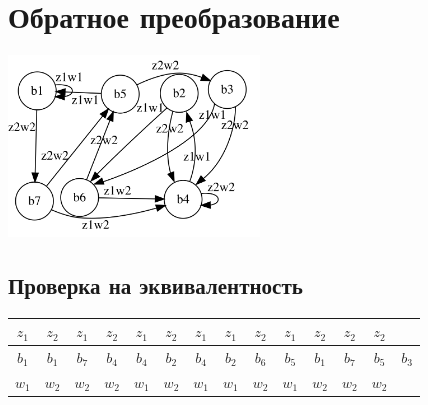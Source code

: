 \documentclass[listings]{labreport}
\begin{document}
\section*{Обратное преобразование}

\includegraphics[width=0.5\textwidth]{mealy.png}

\subsection*{Проверка на эквивалентность}

\begin{tabular}{|c|c|c|c|c|c|c|c|c|c|c|c|c|c|}
\hline
$z_1$ & $z_2$ & $z_1$ & $z_2$ & $z_1$ & $z_2$ & $z_1$ & $z_1$ & $z_2$ & $z_1$ & $z_2$ & $z_2$ & $z_2$ & \\\hline

$b_1$ & $b_1$ & $b_7$ & $b_4$ & $b_4$ & $b_2$ & $b_4$ & $b_2$ & $b_6$ & $b_5$ & $b_1$ & $b_7$ & $b_5$ & $b_3$ \\\hline

$w_1$ & $w_2$ & $w_2$ & $w_2$ & $w_1$ & $w_2$ & $w_1$ & $w_1$ & $w_2$ & $w_1$ & $w_2$ & $w_2$ & $w_2$ & \\\hline
\end{tabular}
\end{document}
